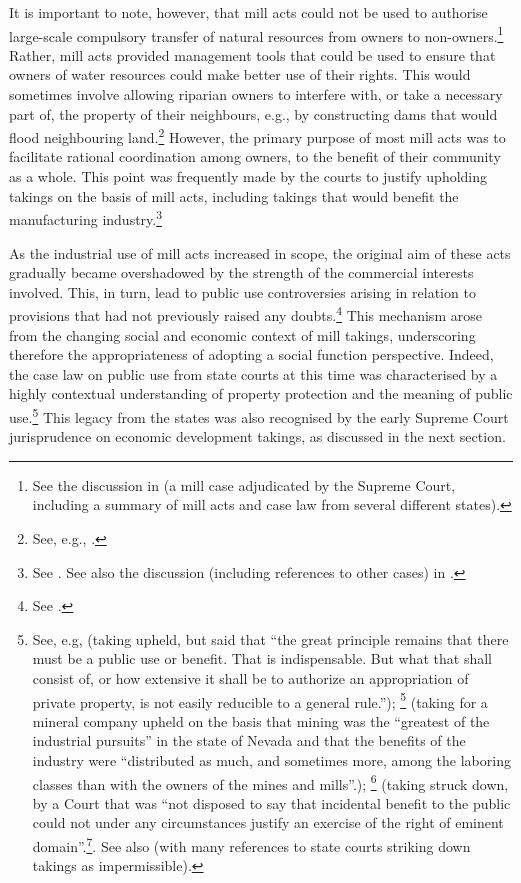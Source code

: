 It is important to note, however, that mill acts could not be used to authorise large-scale compulsory transfer of natural resources from owners to non-owners.\footnote{See the discussion in \cite{head85} (a mill case adjudicated by the Supreme Court, including a summary of mill acts and case law from several different states).} Rather, mill acts provided management tools that could be used to ensure that owners of water resources could make better use of their rights. This would sometimes involve allowing riparian owners to interfere with, or take a necessary part of, the property of their neighbours, e.g., by constructing dams that would flood neighbouring land.\footnote{See, e.g., \cite[265]{staples03}.} However, the primary purpose of most mill acts was to facilitate rational coordination among owners, to the benefit of their community as a whole. This point was frequently made by the courts to justify upholding takings on the basis of mill acts, including takings that would benefit the manufacturing industry.\footnote{See \cite{fiske31}. See also the discussion (including references to other cases) in \cite{head85}.}

As the industrial use of mill acts increased in scope, the original aim of these acts gradually became overshadowed by the strength of the commercial interests involved. This, in turn, lead to public use controversies arising in relation to provisions that had not previously raised any doubts.\footnote{See \cite{head86}.} This mechanism arose from the changing social and economic context of mill takings, underscoring therefore the appropriateness of adopting a social function perspective. Indeed, the case law on public use from state courts at this time was characterised by a highly contextual understanding of property protection and the meaning of public use.\footnote{See, e.g, \cite{scudder32} (taking upheld, but said that ``the great principle remains that there must be a public use or benefit. That is indispensable. But what that shall consist of, or how extensive it shall be to authorize an appropriation of private property, is not easily reducible to a general rule.''); \footcite[409]{seawell76} (taking for a mineral company upheld on the basis that mining was the ``greatest of the industrial pursuits'' in the state of Nevada and that the benefits of the industry were ``distributed as much, and sometimes more, among the laboring classes than with the owners of the mines and mills''.); \footcite[337]{ryerson77} (taking struck down, by a Court that was ``not disposed to say that incidental benefit to the public could not under any circumstances justify an exercise of the right of eminent domain''.\footcite[337]{ryerson77}. See also \cite{gray11} (with many references to state courts striking down takings as impermissible).} This legacy from the states was also recognised by the early Supreme Court jurisprudence on economic development takings, as discussed in the next section.

